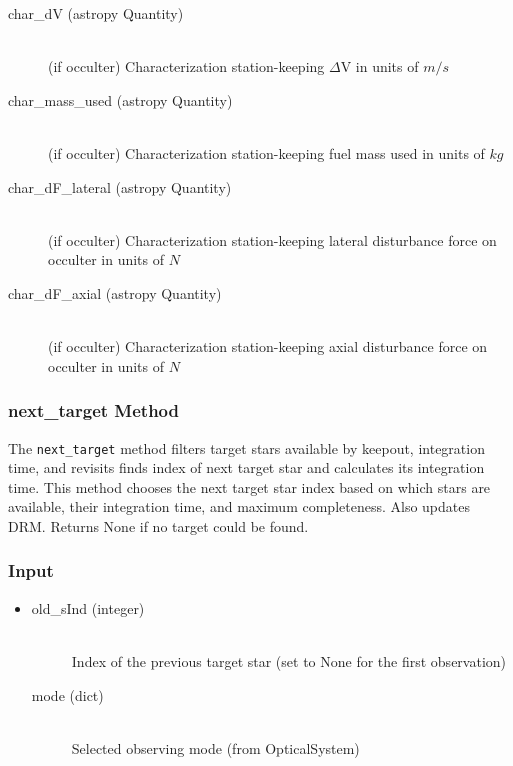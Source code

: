 \documentclass[cleanfoot]{asme2ej}
\begin{document}
\begin{itemize}
\begin{description}
\begin{description}
        \item[char\_dV (astropy Quantity)] \hfill \\ (if occulter) Characterization station-keeping $\Delta$V in units of $ m/s $
        \item[char\_mass\_used (astropy Quantity)] \hfill \\ (if occulter) Characterization station-keeping fuel mass used in units of $ kg $
        \item[char\_dF\_lateral (astropy Quantity)] \hfill \\ (if occulter) Characterization station-keeping lateral disturbance force on occulter in units of $ N $
        \item[char\_dF\_axial (astropy Quantity)] \hfill \\ (if occulter) Characterization station-keeping axial disturbance force on occulter in units of $ N $
    \end{description}
\end{description}
\end{itemize}

\subsubsection{next\_target Method} \label{sec:nexttargettask}
The \verb+next_target+ method filters target stars available by keepout, integration time, and revisits
finds index of next target star and calculates its integration time. This method chooses the next target star index based on which stars are available, their integration time, and maximum completeness. Also updates DRM. Returns None if no target could be found.
\subsubsection*{Input}
\begin{itemize}
\item 
\begin{description}
    \item[old\_sInd (integer)] \hfill \\ Index of the previous target star (set to None for the first observation)
    \item[mode (dict)] \hfill \\ Selected observing mode (from OpticalSystem)
\end{description}
\end{itemize}
\end{document}
